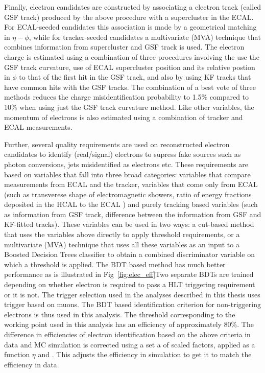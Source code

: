 Finally, electron candidates are constructed by associating a electron track (called GSF track) produced by the above procedure with a supercluster in the ECAL. For ECAL-seeded candidates this association is made by a geometrical matching in $\eta-\phi$, while for tracker-seeded candidates a multivariate (MVA) technique that combines information from supercluster and GSF track is used. The electron charge is estimated using a combination of three procedures involving the use the GSF track curvature, use of ECAL supercluster position and its relative postion in $\phi$ to that of the first hit in the GSF track, and also by using KF tracks that have common hits with the GSF tracks. The combination of a best vote of three methods reduces the charge misidentification probability to 1.5\%  compared to 10\% when using just the GSF track curvature method. Like other variables, the momentum of electrons is also estimated using a combination of tracker and ECAL measurements.


Further, several quality requirements are used on reconstructed electron candidates to identify (real/signal) electrons to supress fake sources such as photon conversions, jets misidentified as electrons etc.
These requirements are based on variables that fall into three broad categories: variables that compare measurements from ECAL and the tracker, variables that come only from ECAL (such as transverese shape of electromagnetic showers, ratio of energy fractions deposited in the HCAL to the ECAL ) and purely tracking based variables (such as information from GSF track, difference between the information from GSF and KF-fitted tracks). These variables can be used in two ways: a cut-based method that uses the variables above directly to apply threshold requirements, or a multivariate (MVA) technique that uses all these variables as an input to a Boosted Decision Trees classifier to obtain a combined discriminator variable on which a threshold is applied. The BDT based method has much better performance as is illustrated in Fig~\ref{fig:elec_eff}Two separate BDTs are trained depending on whether electron is required to pass a HLT triggering requirement or it is not. The trigger selection used in the analyses described in this thesis uses trigger based on muons. The BDT based identification criterion for non-triggering electrons is thus used in this analysis. The threshold corresponding to the working point used in this analysis has an efficiency of approximately 80\%. The difference in efficiencies  of electron identification based on the above criteria in data and MC simulation is corrected using a set a of scaled factors, applied as a function $\eta$ and \pt. This adjusts the efficiency in simulation to get it to match the efficiency in data.  
   

